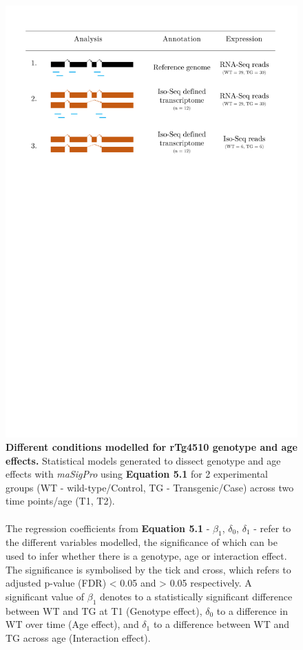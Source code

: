 \begin{figure}[!htp]
	\centering
	\includegraphics[page=2,trim={0 5cm 0 4cm},scale = 0.45]{Figures/Tg4510_diff_figures.pdf}
	\captionsetup{width=0.95\textwidth}
	\caption[Different conditions modelled for rTg4510 genotype and age effects]%
	{\textbf{Different conditions modelled for rTg4510 genotype and age effects.} Statistical models generated to dissect genotype and age effects with \textit{maSigPro} using \textbf{Equation 5.1} for 2 experimental groups (WT - wild-type/Control, TG - Transgenic/Case) across two time points/age (T1, T2). 
	\\\\
	The regression coefficients from \textbf{Equation 5.1} - $\beta_{1}$, $\delta_{0}$, $\delta_{1}$ - refer to the different variables modelled, the significance of which can be used to infer whether there is a genotype, age or interaction effect. The significance is symbolised by the tick and cross, which refers to adjusted p-value (FDR) < 0.05 and > 0.05 respectively. A significant value of $\beta_{1}$ denotes to a statistically significant difference between WT and TG at T1 (Genotype effect), $\delta_{0}$ to a difference in WT over time (Age effect), and $\delta_{1}$ to a difference between WT and TG across age (Interaction effect).}   
	\label{fig:dea_model}
\end{figure}

